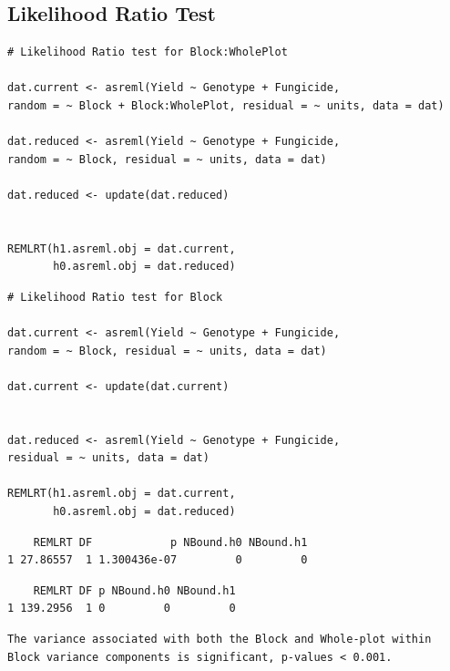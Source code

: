 \documentclass[a4paper, 10pt, fleqn, twosided]{memoir}
\begin{document}
\subsection{Likelihood Ratio Test}

\begin{tcolorbox}[title = Example 5 Likelihood Ratio Test]
\begin{verbatim}
# Likelihood Ratio test for Block:WholePlot

dat.current <- asreml(Yield ~ Genotype + Fungicide,
random = ~ Block + Block:WholePlot, residual = ~ units, data = dat)

dat.reduced <- asreml(Yield ~ Genotype + Fungicide,
random = ~ Block, residual = ~ units, data = dat)

dat.reduced <- update(dat.reduced)


REMLRT(h1.asreml.obj = dat.current,
       h0.asreml.obj = dat.reduced)

\end{verbatim}
\tcblower
\begin{verbatim}
# Likelihood Ratio test for Block

dat.current <- asreml(Yield ~ Genotype + Fungicide,
random = ~ Block, residual = ~ units, data = dat)

dat.current <- update(dat.current)


dat.reduced <- asreml(Yield ~ Genotype + Fungicide,
residual = ~ units, data = dat)

REMLRT(h1.asreml.obj = dat.current,
       h0.asreml.obj = dat.reduced)

\end{verbatim}
\end{tcolorbox}

\begin{tcolorbox}[title = Example 5 Likelihood Ratio Test output]
\begin{verbatim}
    REMLRT DF            p NBound.h0 NBound.h1
1 27.86557  1 1.300436e-07         0         0

\end{verbatim}
\tcblower
\begin{verbatim}
    REMLRT DF p NBound.h0 NBound.h1
1 139.2956  1 0         0         0

\end{verbatim}
\end{tcolorbox}

\begin{tcolorbox}[title = Example 4 Likelihood Ratio Test Interpretation]
\begin{verbatim}
The variance associated with both the Block and Whole-plot within
Block variance components is significant, p-values < 0.001.
\end{verbatim}
\end{tcolorbox}
\end{document}
